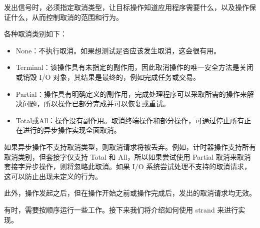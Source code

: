 发出信号时，必须指定取消类型，让目标操作知道应用程序需要什么，以及操作保证什么，从而控制取消的范围和行为。

各种取消类别如下：

\begin{itemize}
\item
None：不执行取消。如果想测试是否应该发生取消，这会很有用。

\item
Terminal：该操作具有未指定的副作用，因此取消操作的唯一安全方法是关闭或销毁 I/O 对象，其结果是最终的，例如完成任务或交易。

\item
Partial：操作具有明确定义的副作用，完成处理程序可以采取所需的操作来解决问题，所以操作已部分完成并可以恢复或重试。

\item
Total或All：操作没有副作用。取消终端操作和部分操作，可通过停止所有正在进行的异步操作实现全面取消。
\end{itemize}

如果异步操作不支持取消类型，则取消请求将被丢弃。例如，计时器操作支持所有取消类别，但套接字仅支持 Total 和 All，所以如果尝试使用 Partial 取消来取消套接字异步操作，则将忽略此取消。如果 I/O 系统尝试处理不支持的取消请求，这可以防止出现未定义的行为。

此外，操作发起之后，但在操作开始之前或操作完成后，发出的取消请求均无效。

有时，需要按顺序运行一些工作。接下来我们将介绍如何使用 strand 来进行实现。









































